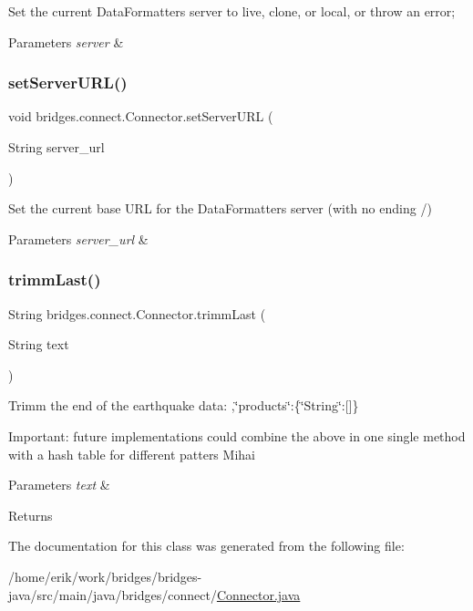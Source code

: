Set the current Data\+Formatters server to live, clone, or local, or throw an error; 
\begin{DoxyParams}{Parameters}
{\em server} & \\
\hline
\end{DoxyParams}
\mbox{\label{classbridges_1_1connect_1_1_connector_a71f449c91e529f79730df27e01fdf674}} 
\subsubsection{\texorpdfstring{set\+Server\+U\+R\+L()}{setServerURL()}}
{\footnotesize\ttfamily void bridges.\+connect.\+Connector.\+set\+Server\+U\+RL (\begin{DoxyParamCaption}\item[{String}]{server\+\_\+url }\end{DoxyParamCaption})}

Set the current base U\+RL for the Data\+Formatters server (with no ending /) 
\begin{DoxyParams}{Parameters}
{\em server\+\_\+url} & \\
\hline
\end{DoxyParams}
\mbox{\label{classbridges_1_1connect_1_1_connector_ac0dca0bd99b6abbbd8a77874a95e6d49}} 
\subsubsection{\texorpdfstring{trimm\+Last()}{trimmLast()}}
{\footnotesize\ttfamily String bridges.\+connect.\+Connector.\+trimm\+Last (\begin{DoxyParamCaption}\item[{String}]{text }\end{DoxyParamCaption})}

Trimm the end of the earthquake data\+: ,\char`\"{}products\char`\"{}\+:\{\char`\"{}\+String\char`\"{}\+:\mbox{[}\mbox{]}\}

Important\+: future implementations could combine the above in one single method with a hash table for different patters Mihai 
\begin{DoxyParams}{Parameters}
{\em text} & \\
\hline
\end{DoxyParams}
\begin{DoxyReturn}{Returns}

\end{DoxyReturn}


The documentation for this class was generated from the following file\+:\begin{DoxyCompactItemize}
\item 
/home/erik/work/bridges/bridges-\/java/src/main/java/bridges/connect/\hyperlink{_connector_8java}{Connector.\+java}\end{DoxyCompactItemize}
